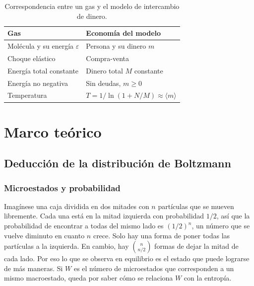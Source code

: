 \documentclass[letterpaper,12pt]{article}
\begin{document}
\begin{table}[H]
  \begin{center}
    \small
    \begin{tabular}{|l|l|}
      \hline
      \textbf{Gas} & \textbf{Economía del modelo} \\
      \hline
      Molécula y su energía $\varepsilon$ & Persona y su dinero $m$ \\
      Choque elástico & Compra-venta \\
      Energía total constante & Dinero total $M$ constante \\
      Energía no negativa & Sin deudas, $m\geq0$ \\
      Temperatura & $T=1/\ln(1+N/M)\approx\langle m\rangle$ \\
      \hline
    \end{tabular}
  \end{center}
  \caption{Correspondencia entre un gas y el modelo de intercambio de dinero.}
  \label{tab:analogia}
\end{table}

\section*{Marco teórico}

\subsection*{Deducción de la distribución de Boltzmann}

\subsubsection*{Microestados y probabilidad}
Imagínese una caja dividida en dos mitades con $n$ partículas que se mueven libremente. Cada una está en la mitad izquierda con probabilidad $1/2$, así que la probabilidad de encontrar a todas del mismo lado es $(1/2)^n$, un número que se vuelve diminuto en cuanto $n$ crece. Solo hay una forma de poner todas las partículas a la izquierda. En cambio, hay $\binom{n}{n/2}$ formas de dejar la mitad de cada lado. Por eso lo que se observa en equilibrio es el estado que puede lograrse de más maneras. Si $W$ es el número de microestados que corresponden a un mismo macroestado, queda por saber cómo se relaciona $W$ con la entropía.
\end{document}
